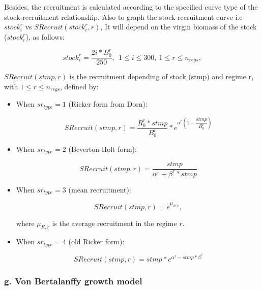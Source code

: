 \documentclass{article}
\begin{document}
Besides, the recruitment is calculated according to the specified curve type of the stock-recruitment relationship. Also to graph the stock-recruitment curve i.e $stock^r_i$ vs $SRecruit(stock^r_i, r)$, It will depend on the virgin biomass of the stock ($stock_i^r$), as follows:

\begin{equation}
stock^r_i=\dfrac{2i*B^{r}_0}{250}, \ \ 1\leq i \leq 300, \ 1\leq r \leq n_{regs},
\end{equation}

$SRecruit(stmp, r)$ is the recruitment depending of stock (stmp) and regime r, with $1\leq r \leq n_{regs}$, defined by:
\begin{itemize}

\item When $sr_{type}=1$ (Ricker form from Dorn):

    \begin{equation}
    SRecruit(stmp, r) = \dfrac{R^{r}_0* stmp}{B^{r}_0}*e^{\alpha^r \left(1-\dfrac{stmp}{B^{r}_0}\right)}
    \end{equation}

\item When $sr_{type}=2$ (Beverton-Holt form):

    \begin{equation}
    SRecruit(stmp, r) = \dfrac{stmp}{\alpha^r+\beta^r* stmp}
    \end{equation}

\item When $sr_{type}=3$ (mean recruitment):

    \begin{equation}
    SRecruit(stmp, r) = e^{\mu_{R,r}},
    \end{equation}

    where $\mu_{R,r}$ is the average recruitment in the regime $r$.

\item When $sr_{type}=4$ (old Ricker form):

    \begin{equation}
    SRecruit(stmp, r) =  stmp *e^{\alpha^r-stmp *\beta^r}
    \end{equation}

\end{itemize}


\hfill

\subsubsection{g. Von Bertalanffy growth model}
\end{document}
